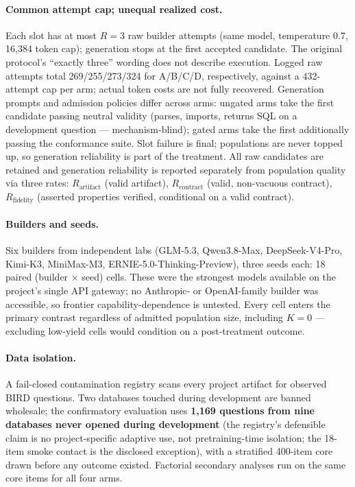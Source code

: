 \paragraph{Common attempt cap; unequal realized cost.} Each slot has at most
$R{=}3$ raw builder attempts (same model, temperature 0.7, 16{,}384
token cap); generation stops at the first accepted candidate. The original
protocol's ``exactly three'' wording does not describe execution. Logged
raw attempts total 269/255/273/324 for A/B/C/D, respectively, against a
432-attempt cap per arm; actual token costs are not fully recovered.
Generation prompts and admission policies differ across arms:
ungated arms take the first candidate passing neutral validity (parses,
imports, returns SQL on a development question --- mechanism-blind); gated
arms take the first additionally passing the conformance suite. Slot failure
is final; populations are never topped up, so generation reliability is part
of the treatment. All raw candidates are retained and generation
reliability is reported separately from population quality via three rates:
$R_{\mathrm{artifact}}$ (valid artifact), $R_{\mathrm{contract}}$ (valid,
non-vacuous contract), $R_{\mathrm{fidelity}}$ (asserted properties
verified, conditional on a valid contract).

\paragraph{Builders and seeds.} Six builders from independent labs (GLM-5.3,
Qwen3.8-Max, DeepSeek-V4-Pro, Kimi-K3, MiniMax-M3,
ERNIE-5.0-Thinking-Preview), three seeds each: 18 paired (builder $\times$
seed) cells. These were the strongest models available on the project's single API
gateway; no Anthropic- or OpenAI-family builder was accessible, so frontier
capability-dependence is untested. Every cell enters the primary contrast regardless of admitted
population size, including $K{=}0$ --- excluding low-yield cells would
condition on a post-treatment outcome.

\paragraph{Data isolation.} A fail-closed contamination registry scans every
project artifact for observed BIRD questions. Two databases touched during
development are banned wholesale; the confirmatory evaluation uses
\textbf{1{,}169 questions from nine databases never opened during development}
(the registry's defensible claim is no project-specific adaptive use, not
pretraining-time isolation; the 18-item smoke contact is the disclosed exception), with a
stratified 400-item core drawn before any outcome existed. Factorial
secondary analyses run on the same core items for all four arms.

